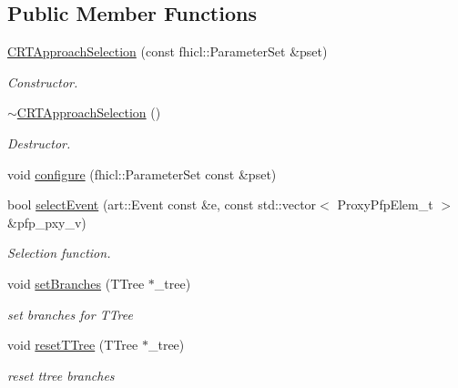 \subsection*{Public Member Functions}
\begin{DoxyCompactItemize}
\item 
\hyperlink{classselection_1_1CRTApproachSelection_ae8b705a69ee56ed6bafb37528344be85}{C\+R\+T\+Approach\+Selection} (const fhicl\+::\+Parameter\+Set \&pset)
\begin{DoxyCompactList}\small\item\em Constructor. \end{DoxyCompactList}\item 
\hyperlink{classselection_1_1CRTApproachSelection_a1ea085fa9ab18fdecbb863a25cea5eb1}{$\sim$\+C\+R\+T\+Approach\+Selection} ()\hypertarget{classselection_1_1CRTApproachSelection_a1ea085fa9ab18fdecbb863a25cea5eb1}{}\label{classselection_1_1CRTApproachSelection_a1ea085fa9ab18fdecbb863a25cea5eb1}

\begin{DoxyCompactList}\small\item\em Destructor. \end{DoxyCompactList}\item 
void \hyperlink{classselection_1_1CRTApproachSelection_a95cea2d1bd14aa512b6d4c04059d5711}{configure} (fhicl\+::\+Parameter\+Set const \&pset)
\item 
bool \hyperlink{classselection_1_1CRTApproachSelection_a9dffc74d919ac0586d57c1de740f4ce9}{select\+Event} (art\+::\+Event const \&e, const std\+::vector$<$ Proxy\+Pfp\+Elem\+\_\+t $>$ \&pfp\+\_\+pxy\+\_\+v)
\begin{DoxyCompactList}\small\item\em Selection function. \end{DoxyCompactList}\item 
void \hyperlink{classselection_1_1CRTApproachSelection_aa60ae2b3ee3f7776a3c35ed2a6aa8bea}{set\+Branches} (T\+Tree $\ast$\+\_\+tree)\hypertarget{classselection_1_1CRTApproachSelection_aa60ae2b3ee3f7776a3c35ed2a6aa8bea}{}\label{classselection_1_1CRTApproachSelection_aa60ae2b3ee3f7776a3c35ed2a6aa8bea}

\begin{DoxyCompactList}\small\item\em set branches for T\+Tree \end{DoxyCompactList}\item 
void \hyperlink{classselection_1_1CRTApproachSelection_a73491b9748240f8d5185482fe5e1d6a9}{reset\+T\+Tree} (T\+Tree $\ast$\+\_\+tree)\hypertarget{classselection_1_1CRTApproachSelection_a73491b9748240f8d5185482fe5e1d6a9}{}\label{classselection_1_1CRTApproachSelection_a73491b9748240f8d5185482fe5e1d6a9}

\begin{DoxyCompactList}\small\item\em reset ttree branches \end{DoxyCompactList}\end{DoxyCompactItemize}
